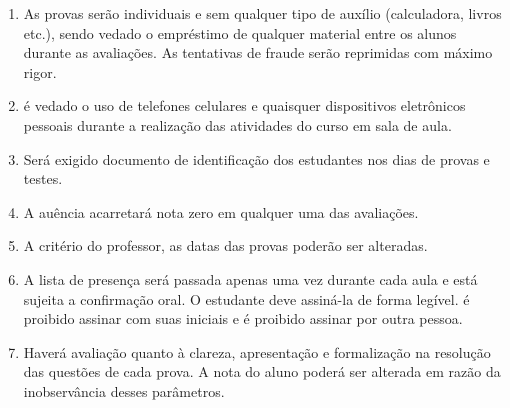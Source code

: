 \documentclass[12pt]{exam}
\begin{document}
\begin{enumerate}[label={\arabic*})]
\item As provas serão individuais e sem qualquer tipo de auxílio (calculadora, livros etc.), sendo vedado o empréstimo de
qualquer material entre os alunos durante as avaliações. As tentativas de fraude serão reprimidas com máximo rigor.

\item é vedado o uso de telefones celulares e quaisquer dispositivos eletrônicos pessoais durante a realização das atividades do curso
em sala de aula.

\item Será exigido documento de identificação dos estudantes nos dias de provas e testes.

\item A auência acarretará nota zero em qualquer uma das avaliações.

\item A critério do professor, as datas das provas poderão ser alteradas.

\item A lista de presença será passada apenas uma vez durante cada aula e está sujeita a confirmação oral. O
estudante deve assiná-la de forma legível. {é} proibido assinar com suas iniciais e é proibido assinar por outra pessoa.

\item Haverá avaliação quanto à clareza, apresentação e formalização na  resolução das questões de cada prova. A nota do aluno poderá ser alterada em razão da
inobservância desses parâmetros.
\end{enumerate}
\end{document}
